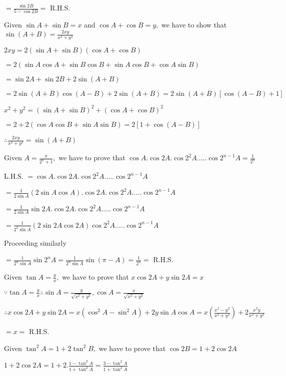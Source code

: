   $= \frac{\sin 2B}{5 - \cos 2B} =$ R.H.S.

\item Given $\sin A + \sin B = x$ and $\cos A + \cos B = y,$ we have to show that $\sin(A + B) = \frac{2xy}{x^2 +
  y^2}$

  $2xy = 2(\sin A + \sin B)(\cos A + \cos B)$

  $= 2(\sin A\cos A + \sin B\cos B + \sin A\cos B + \cos A\sin B)$

  $= \sin2A + \sin 2B + 2\sin(A + B)$

  $= 2\sin(A + B)\cos(A - B) + 2\sin(A + B) = 2\sin(A + B)[\cos(A - B) + 1]$

  $x^2 + y^2 = (\sin A + \sin B)^2 + (\cos A + \cos B)^2$

  $= 2 + 2(\cos A\cos B + \sin A \sin B) = 2[1 + \cos (A - B)]$

  $\therefore \frac{2xy}{x^2 + y^2} = \sin(A + B)$

\item Given $A= \frac{\pi}{2^n + 1},$ we have to prove that $\cos A.\cos 2A. \cos2^2A.\ldots.\cos2^{n - 1}A =
  \frac{1}{2^n}$

  L.H.S. $= \cos A.\cos 2A. \cos2^2A.\ldots.\cos2^{n - 1}A$

  $= \frac{1}{2\sin A}(2\sin A\cos A).\cos 2A. \cos2^2A.\ldots.\cos2^{n - 1}A$

  $= \frac{1}{2\sin A}\sin 2A.\cos 2A.\cos2^2A.\ldots.\cos2^{n - 1}A$

  $= \frac{1}{2^2\sin A}(2\sin 2A\cos 2A)\cos2^2A.\ldots.\cos2^{n - 1}A$

  Proceeding similarly

  $= \frac{1}{2^n\sin A}\sin2^n A = \frac{1}{2^n\sin A}\sin(\pi - A) = \frac{1}{2^n} =$ R.H.S.

\item Given $\tan A = \frac{y}{x},$ we have to prove that $x\cos 2A + y\sin 2A = x$

  $\because \tan A = \frac{y}{x} \therefore \sin A = \frac{y}{\sqrt{x^2 + y^2}}, \cos A = \frac{x}{\sqrt{x^2 + y^2}}$

  $\therefore x\cos 2A + y\sin 2A = x(\cos^2A - \sin^2A) + 2y\sin A\cos A = x\left(\frac{x^2 - y^2}{x^2 + y^2}\right) +
  2\frac{x^2y}{x^2 + y^2}$

  $= x =$ R.H.S.

\item Given $\tan^2A = 1 + 2\tan^2B,$ we have to prove that $\cos 2B = 1 + 2\cos 2A$

  $1 + 2\cos 2A = 1 + 2.\frac{1 - \tan^2A}{1 + \tan^2A} = \frac{3 - \tan^2A}{1 + \tan^2A}$

